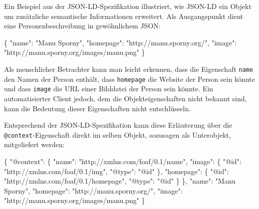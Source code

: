 \documentclass[,a4paper]{article}
\newenvironment{Shaded}{}{}
\newcommand{\DataTypeTok}[1]{\textcolor[rgb]{0.56,0.13,0.00}{{#1}}}
\newcommand{\StringTok}[1]{\textcolor[rgb]{0.25,0.44,0.63}{{#1}}}
\newcommand{\NormalTok}[1]{{#1}}
\begin{document}
Ein Beispiel aus der JSON-LD-Spezifikation illustriert, wie JSON-LD ein
Objekt um zusätzliche semantische Informationen erweitert. Als
Ausgangspunkt dient eine Personenbeschreibung in gewöhnlichem JSON:

\begin{Shaded}
\begin{Highlighting}[]
\NormalTok{\{}
  \DataTypeTok{"name"}\NormalTok{: }\StringTok{"Manu Sporny"}\NormalTok{,}
  \DataTypeTok{"homepage"}\NormalTok{: }\StringTok{"http://manu.sporny.org/"}\NormalTok{,}
  \DataTypeTok{"image"}\NormalTok{: }\StringTok{"http://manu.sporny.org/images/manu.png"}
\NormalTok{\}}
\end{Highlighting}
\end{Shaded}

Als menschlicher Betrachter kann man leicht erkennen, dass die
Eigenschaft \texttt{name} den Namen der Person enthält, dass
\texttt{homepage} die Website der Person sein könnte und dass
\texttt{image} die URL einer Bilddatei der Person sein könnte. Ein
automatisierter Client jedoch, dem die Objekteigenschaften nicht bekannt
sind, kann die Bedeutung dieser Eigenschaften nicht entschlüsseln.

Entsprechend der JSON-LD-Spezifikation kann diese Erläuterung über die
\texttt{@context}-Eigenschaft direkt im selben Objekt, sozusagen als
Unterobjekt, mitgeliefert werden:

\begin{Shaded}
\begin{Highlighting}[]
\NormalTok{\{}
  \DataTypeTok{"@context"}\NormalTok{:}
  \NormalTok{\{}
    \DataTypeTok{"name"}\NormalTok{: }\StringTok{"http://xmlns.com/foaf/0.1/name"}\NormalTok{,}
    \DataTypeTok{"image"}\NormalTok{: \{}
      \DataTypeTok{"@id"}\NormalTok{: }\StringTok{"http://xmlns.com/foaf/0.1/img"}\NormalTok{,}
      \DataTypeTok{"@type"}\NormalTok{: }\StringTok{"@id"}
    \NormalTok{\},}
    \DataTypeTok{"homepage"}\NormalTok{: \{}
      \DataTypeTok{"@id"}\NormalTok{: }\StringTok{"http://xmlns.com/foaf/0.1/homepage"}\NormalTok{,}
      \DataTypeTok{"@type"}\NormalTok{: }\StringTok{"@id"}
    \NormalTok{\}}
  \NormalTok{\},}
  \DataTypeTok{"name"}\NormalTok{: }\StringTok{"Manu Sporny"}\NormalTok{,}
  \DataTypeTok{"homepage"}\NormalTok{: }\StringTok{"http://manu.sporny.org/"}\NormalTok{,}
  \DataTypeTok{"image"}\NormalTok{: }\StringTok{"http://manu.sporny.org/images/manu.png"}
\NormalTok{\}}
\end{Highlighting}
\end{Shaded}
\end{document}
